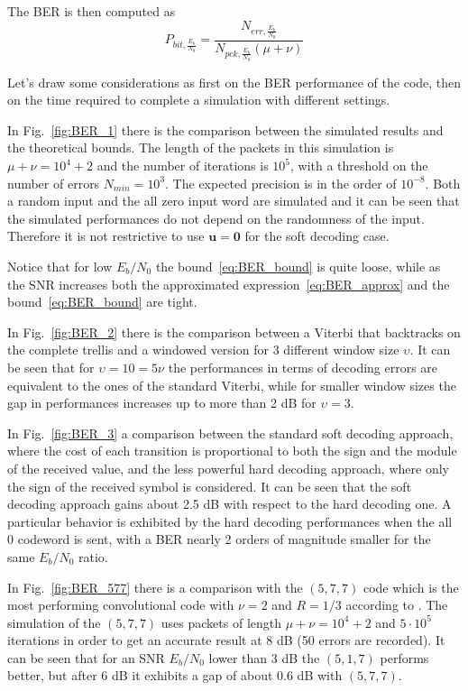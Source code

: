 \documentclass[10pt]{article}
\begin{document}
The BER is then computed as
\begin{equation}
	P_{bit, \frac{E_b}{N_0}} =\frac{N_{err, \frac{E_b}{N_0}}}{N_{pck, \frac{E_b}{N_0}}(\mu+\nu)}
\end{equation}

Let's draw some considerations as first on the BER performance of the code, then on the time required to complete a simulation with different settings.

In Fig.~\ref{fig:BER_1} there is the comparison between the simulated results and the theoretical bounds. The length of the packets in this simulation is $\mu + \nu = 10^4 + 2$ and the number of iterations is $10^5$, with a threshold on the number of errors $N_{min} = 10^3$. The expected precision is in the order of $10^{-8}$. Both a random input and the all zero input word are simulated and it can be seen that the simulated performances do not depend on the randomness of the input. Therefore it is not restrictive to use $\mathbf{u} = \mathbf{0}$ for the soft decoding case.

Notice that for low $E_b/N_0$ the bound~\eqref{eq:BER_bound} is quite loose, while as the SNR increases both the approximated expression~\eqref{eq:BER_approx} and the bound~\eqref{eq:BER_bound} are tight. 

In Fig.~\ref{fig:BER_2} there is the comparison between a Viterbi that backtracks on the complete trellis and a windowed version for 3 different window size $\upsilon$. It can be seen that for $\upsilon = 10 = 5\nu$ the performances in terms of decoding errors are equivalent to the ones of the standard Viterbi, while for smaller window sizes the gap in performances increases up to more than 2 dB for $\upsilon = 3$. 

In Fig.~\ref{fig:BER_3} a comparison between the standard soft decoding approach, where the cost of each transition is proportional to both the sign and the module of the received value, and the less powerful hard decoding approach, where only the sign of the received symbol is considered. 
It can be seen that the soft decoding approach gains about 2.5 dB with respect to the hard decoding one. A particular behavior is exhibited by the hard decoding performances when the all 0 codeword is sent, with a BER nearly 2 orders of magnitude smaller for the same $E_b/N_0$ ratio. 

In Fig.~\ref{fig:BER_577} there is a comparison with the $(5, 7, 7)$ code which is the most performing convolutional code with $\nu = 2$ and $R=1/3$ according to \cite{proakis}. The simulation of the $(5,7,7)$ uses packets of length $\mu + \nu = 10^4 + 2$ and $5\cdot10^{5}$ iterations in order to get an accurate result at 8 dB (50 errors are recorded). It can be seen that for an SNR $E_b/N_0$ lower than 3 dB the $(5,1,7)$ performs better, but after 6 dB it exhibits a gap of about 0.6 dB with $(5,7,7)$.
\end{document}
